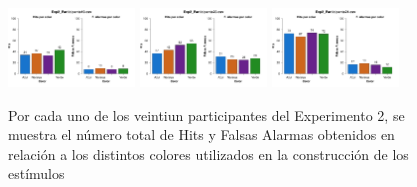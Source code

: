 \begin{figure}[th]
\includegraphics[width=0.30\textwidth]{Figures/Color_Exp2_P19} \includegraphics[width=0.30\textwidth]{Figures/Color_Exp2_P20} \includegraphics[width=0.30\textwidth]{Figures/Color_Exp2_P21} 
\caption[Hits y Falsas Alarmas obtenidos por Color; Experimento 2]{Por cada uno de los veintiun participantes del Experimento 2, se muestra el número total de Hits y Falsas Alarmas obtenidos en relación a los distintos colores utilizados en la construcción de los estímulos}
\label{fig:Color_E2}
\end{figure}

